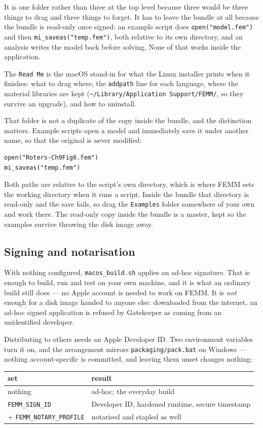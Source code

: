 \documentclass[11pt]{article}
\begin{document}
It is one folder rather than three at the top level because three would
be three things to drag and three things to forget.  It has to leave the
bundle at all because the bundle is read-only once signed: an example
script does \verb+open("model.fem")+ and then
\verb+mi_saveas("temp.fem")+, both relative to its own directory, and an
analysis writes the model back before solving.  None of that works inside
the application.

The \texttt{Read Me} is the macOS stand-in for what the Linux installer
prints when it finishes: what to drag where, the \texttt{addpath} line for
each language, where the material libraries are kept
(\texttt{\textasciitilde/Library/Application Support/FEMM/}, so they
survive an upgrade), and how to uninstall.

That folder is not a duplicate of the copy inside the bundle, and the
distinction matters.  Example scripts open a model and immediately save
it under another name, so that the original is never modified:
\begin{lstlisting}
open("Roters-Ch9Fig6.fem")
mi_saveas("temp.fem")
\end{lstlisting}
Both paths are relative to the script's own directory, which is where
FEMM sets the working directory when it runs a script.  Inside the
bundle that directory is read-only and the save fails, so drag the
\texttt{Examples} folder somewhere of your own and work there.  The
read-only copy inside the bundle is a master, kept so the examples
survive throwing the disk image away.

\subsection{Signing and notarisation}

With nothing configured, \texttt{macos\_build.sh} applies an ad-hoc
signature.  That is enough to build, run and test on your own machine,
and it is what an ordinary build still does --- no Apple account is
needed to work on FEMM.  It is \emph{not} enough for a disk image handed
to anyone else: downloaded from the internet, an ad-hoc signed
application is refused by Gatekeeper as coming from an unidentified
developer.

Distributing to others needs an Apple Developer ID.  Two environment
variables turn it on, and the arrangement mirrors
\texttt{packaging/pack.bat} on Windows --- nothing account-specific is
committed, and leaving them unset changes nothing:

\begin{center}
\begin{tabular}{ll}
\hline
\textbf{set} & \textbf{result} \\
\hline
nothing & ad-hoc; the everyday build \\
\texttt{FEMM\_SIGN\_ID} & Developer ID, hardened runtime, secure timestamp \\
\quad + \texttt{FEMM\_NOTARY\_PROFILE} & notarised and stapled as well \\
\hline
\end{tabular}
\end{center}
\end{document}
